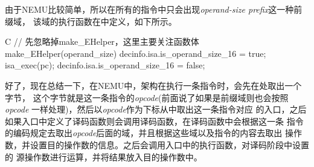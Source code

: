 由于NEMU比较简单，所以在所有的指令中只会出现\emph{operand-size prefix}这一种前缀域，
该域的执行函数在中定义，如下所示。
\begin{codes*}{C}
// 先忽略掉make_EHelper，这里主要关注函数体
make_EHelper(operand_size) {
  decinfo.isa.is_operand_size_16 = true;
  isa_exec(pc);
  decinfo.isa.is_operand_size_16 = false;
}
\end{codes*}

好了，现在总结一下，在NEMU中，\arch 架构在执行一条指令时，会先在\pc 处取出一个字节，
这个字节就是这一条指令的\emph{opcode}(前面说了如果是前缀域则也会按照\emph{opcode}
一样处理)，然后以\emph{opcode}作为下标从中取出这一条指令对应
的入口，之后如果入口中定义了译码函数则会调用译码函数，在译码函数中会根据这一条
指令的编码规定去取出\emph{opcode}后面的域，并且根据这些域以及指令的内容去取出
操作数，并设置目的操作数的信息。之后会调用入口中的执行函数，对译码阶段中设置的
源操作数进行运算，并将结果放入目的操作数中。
